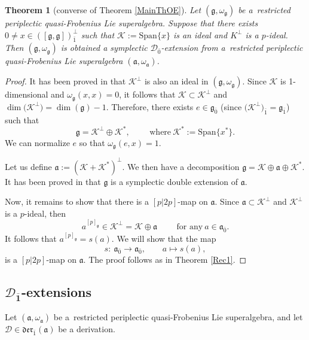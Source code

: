 \documentclass[pdftex]{sigma}
\numberwithin{equation}{section}
\newtheorem{Theorem}{Theorem}[section]
\begin{document}
\begin{Theorem}[converse of Theorem \ref{MainThOE}]
\label{Rec3}
Let $(\mathfrak{g},\omega_\mathfrak{g})$ be a~restricted periplectic quasi-Frobenius Lie superalgebra. Suppose that there exists $0\not = x \in ([\mathfrak{g}, \mathfrak{g}])^\perp_{\bar 1}$ such that $\mathscr{K}:=\mathrm{Span}\{x\}$ is an ideal and $K^\perp$ is a $p$-ideal. Then $(\mathfrak{g},\omega_\mathfrak{g})$ is obtained a symplectic ${\mathscr D}_{\bar 0}$-extension from a~restricted periplectic quasi-Frobenius Lie superalgebra $(\mathfrak{a},\omega_\mathfrak{a})$.%
\end{Theorem}
\begin{proof}
It has been proved in \cite{BM} that $\mathscr{K}^\perp$ is also an ideal in $(\mathfrak{g},\omega_\mathfrak{g})$. Since $\mathscr{K}$ is 1-dimensional and $\omega_\mathfrak{g}(x,x)=0$, it follows that $\mathscr{K}\subset \mathscr{K}^\perp$ and $\dim\bigl(\mathscr{K}^\perp\bigr)=\dim(\mathfrak{g})-1$. Therefore, there exists $e \in \mathfrak{g}_{\bar 0}$ \big(since $\bigl(\mathscr{K}^\perp\bigr)_{\bar 1}=\mathfrak{g}_{\bar 1}$\big) such that
\[
\mathfrak{g}=\mathscr{K}^\perp\oplus \mathscr{K}^*, \qquad \text{ where} \ \mathscr{K}^*:=\mathrm{Span}\{x^*\}.
\]
We can normalize $e$ so that $\omega_\mathfrak{g}(e,x)=1$.

Let us define $\mathfrak{a}:=(\mathscr{K} +\mathscr{K}^*)^\perp$. We then have a decomposition $\mathfrak{g}=\mathscr{K} \oplus \mathfrak{a} \oplus \mathscr{K}^*$. It has been proved in \cite{BM} that $\mathfrak{g}$ is a symplectic double extension of $\mathfrak{a}$.


Now, it remains to show that there is a $[p|2p]$-map on $\mathfrak{a}$. Since $\mathfrak{a} \subset \mathscr{K}^\perp$ and $\mathscr{K}^\perp$ is a $p$-ideal, then
\[
a^{[p]_\mathfrak{g}}\in \mathscr{K}^\perp=\mathscr{K} \oplus \mathfrak{a} \qquad \text{ for any}\ a \in \mathfrak{a}_{\bar 0}.
\]
It follows that $ a^{[p]_\mathfrak{g}}=s(a).$ We will show that the map
\[
s\colon\ \mathfrak{a}_{\bar 0} \rightarrow \mathfrak{a}_{\bar 0}, \qquad a\mapsto s(a),
\]
is a $[p|2p]$-map on $\mathfrak{a}$. The proof follows as in Theorem \ref{Rec1}.
\end{proof}
\subsection[D\_1-extensions]{$\boldsymbol{{\mathscr D}_{\bar 1}}$-extensions}
Let $(\mathfrak{a}, \omega_\mathfrak{a})$ be a~restricted periplectic quasi-Frobenius Lie superalgebra, and let ${\mathscr D}\in \mathfrak{der}_{\bar 1}(\mathfrak{a})$ be a derivation.
\end{document}
